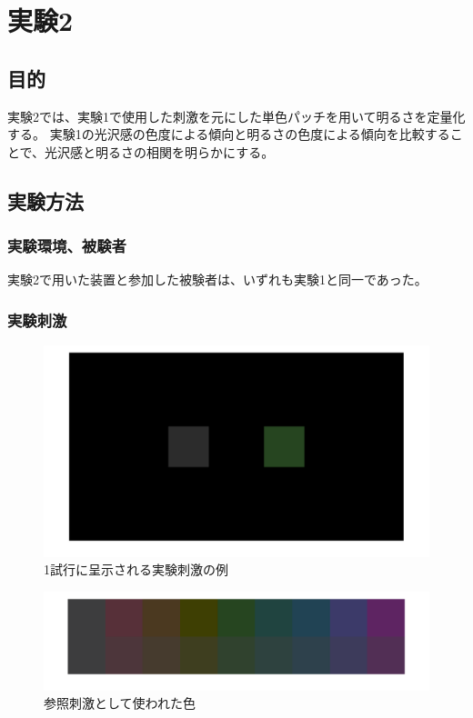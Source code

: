 \chapter{実験2}

\section{目的}

    実験2では、実験1で使用した刺激を元にした単色パッチを用いて明るさを定量化する。
    実験1の光沢感の色度による傾向と明るさの色度による傾向を比較することで、光沢感と明るさの相関を明らかにする。


\section{実験方法}
    \subsection{実験環境、被験者}

        実験2で用いた装置と参加した被験者は、いずれも実験1と同一であった。

    \subsection{実験刺激}

        \begin{figure}[h]
            \centering
            \includegraphics[width=14.0cm]{./img/ex2_stimuli2.png}
            \caption{1試行に呈示される実験刺激の例}
            \label{ex1_procedure}
        \end{figure}

        \begin{figure}[h]
            \centering
            \includegraphics[width=14.0cm]{./img/patchStimuli.png}
            \caption{参照刺激として使われた色}
            \label{ex1_procedure}
        \end{figure}

